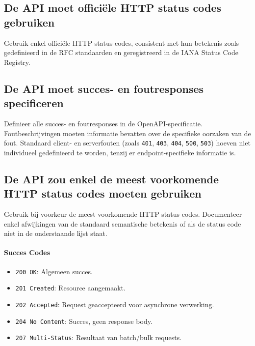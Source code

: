 \subsection{De API moet officiële HTTP status codes gebruiken}
\label{subsection:officiele_http_status_codes}

Gebruik enkel officiële HTTP status codes, consistent met hun betekenis zoals gedefinieerd in de RFC standaarden en geregistreerd in de IANA Status Code Registry.

\subsection{De API moet succes- en foutresponses specificeren}
\label{subsection:succes_en_foutresponses}

Definieer alle succes- en foutresponses in de OpenAPI-specificatie. Foutbeschrijvingen moeten informatie bevatten over de specifieke oorzaken van de fout. Standaard client- en serverfouten (zoals \texttt{401}, \texttt{403}, \texttt{404}, \texttt{500}, \texttt{503}) hoeven niet individueel gedefinieerd te worden, tenzij er endpoint-specifieke informatie is.

\subsection{De API zou enkel de meest voorkomende HTTP status codes moeten gebruiken}
\label{subsection:meest_voorkomende_http_status_codes}

Gebruik bij voorkeur de meest voorkomende HTTP status codes. Documenteer enkel afwijkingen van de standaard semantische betekenis of als de status code niet in de onderstaande lijst staat.

\paragraph{Succes Codes}

\begin{itemize}
    \item \texttt{200 OK}: Algemeen succes.
    \item \texttt{201 Created}: Resource aangemaakt.
    \item \texttt{202 Accepted}: Request geaccepteerd voor asynchrone verwerking.
    \item \texttt{204 No Content}: Succes, geen response body.
    \item \texttt{207 Multi-Status}: Resultaat van batch/bulk requests.
\end{itemize}

